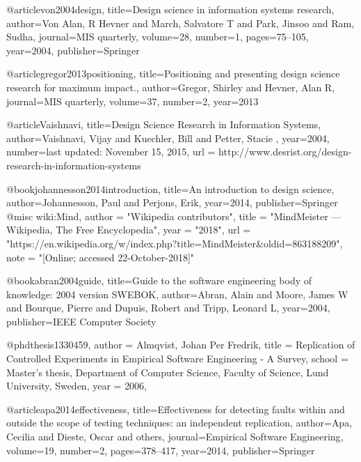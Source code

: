 @article{von2004design,
  title={Design science in information systems research},
  author={Von Alan, R Hevner and March, Salvatore T and Park, Jinsoo and Ram, Sudha},
  journal={MIS quarterly},
  volume={28},
  number={1},
  pages={75--105},
  year={2004},
  publisher={Springer}
}

@article{gregor2013positioning,
  title={Positioning and presenting design science research for maximum impact.},
  author={Gregor, Shirley and Hevner, Alan R},
  journal={MIS quarterly},
  volume={37},
  number={2},
  year={2013}
}

@article{Vaishnavi,
  title={Design Science Research in Information Systems},
  author={Vaishnavi, Vijay and  Kuechler, Bill and Petter, Stacie }, 
  year={2004},
  number={last updated: November 15, 2015},
  url = {http://www.desrist.org/design-research-in-information-systems}
}

@book{johannesson2014introduction,
  title={An introduction to design science},
  author={Johannesson, Paul and Perjons, Erik},
  year={2014},
  publisher={Springer}
}
@misc{ wiki:Mind,
    author = "{Wikipedia contributors}",
    title = "MindMeister --- {Wikipedia}{,} The Free Encyclopedia",
    year = "2018",
    url = "https://en.wikipedia.org/w/index.php?title=MindMeister&oldid=863188209",
    note = "[Online; accessed 22-October-2018]"
  }


@book{abran2004guide,
  title={Guide to the software engineering body of knowledge: 2004 version SWEBOK},
  author={Abran, Alain and Moore, James W and Bourque, Pierre and Dupuis, Robert and Tripp, Leonard L},
  year={2004},
  publisher={IEEE Computer Society}
}

@phdthesis{1330459,
  author       = {Almqvist, Johan Per Fredrik},
  title        = {Replication of Controlled Experiments in Empirical Software Engineering - A Survey},
  school         = {Master’s thesis, Department of Computer Science, Faculty of Science, Lund University, Sweden}, 
  year         = {2006},
}


@article{apa2014effectiveness,
  title={Effectiveness for detecting faults within and outside the scope of testing techniques: an independent replication},
  author={Apa, Cecilia and Dieste, Oscar and others},
  journal={Empirical Software Engineering},
  volume={19},
  number={2},
  pages={378--417},
  year={2014},
  publisher={Springer}
}

